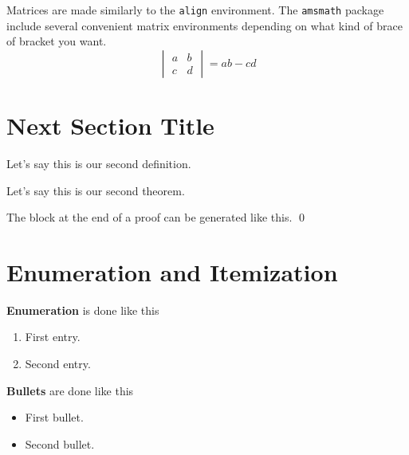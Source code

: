 Matrices are made similarly to the \verb+align+ environment.
The \verb+amsmath+ package include several convenient matrix environments depending on what kind of brace of bracket you want.
\begin{equation}
	\begin{vmatrix}
		a & b\\
		c & d
	\end{vmatrix}
	=
	ab - cd
\end{equation}


\section{Next Section Title}

\begin{definition}
\label{def2}

Let's say this is our second definition.

\end{definition}

\begin{theorem}
\label{th2}

Let's say this is our second theorem.

\end{theorem}

The block at the end of a proof can be generated like this. \qed


\section{Enumeration and Itemization}

{\bf Enumeration} is done like this

\begin{enumerate}
\item
\label{en1}
First entry.

\item
\label{en2}
Second entry.

\end{enumerate}


{\bf Bullets} are done like this

\begin{itemize}
\item
First bullet.

\item
Second bullet.

\end{itemize}


